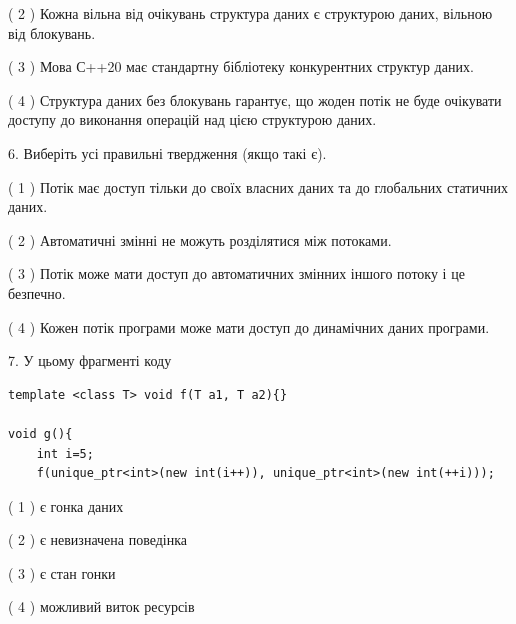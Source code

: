 \documentclass[12pt, ukrainian]{article}
\begin{document}
\begin {large}
{( 2 ) Кожна вільна від очікувань структура даних є структурою даних, вільною від блокувань.%

( 3 ) Мова С++20 має стандартну бібліотеку конкурентних структур даних.%

( 4 ) Структура даних без блокувань гарантує, що жоден потік не буде очікувати доступу до виконання операцій над цією структурою даних.%
\newpage



\vspace{5mm}
6. Виберіть усі правильні твердження (якщо такі є).\par
\vspace{2mm}

( 1 ) Потік має доступ тільки до своїх власних даних та до глобальних статичних даних.%

( 2 ) Автоматичні змінні не можуть розділятися між потоками.%

( 3 ) Потік може мати доступ до автоматичних змінних іншого потоку і це безпечно.%

( 4 ) Кожен потік програми може мати доступ до динамічних даних програми.%


\vspace{5mm}
7. У цьому фрагменті коду
\begin{verbatim}
template <class T> void f(T a1, T a2){}

void g(){
    int i=5;
    f(unique_ptr<int>(new int(i++)), unique_ptr<int>(new int(++i)));
\end{verbatim}

( 1 ) є гонка даних%

( 2 ) є невизначена поведінка%

( 3 ) є стан гонки%

( 4 ) можливий виток ресурсів%
}
\end {large}
\end{document}
